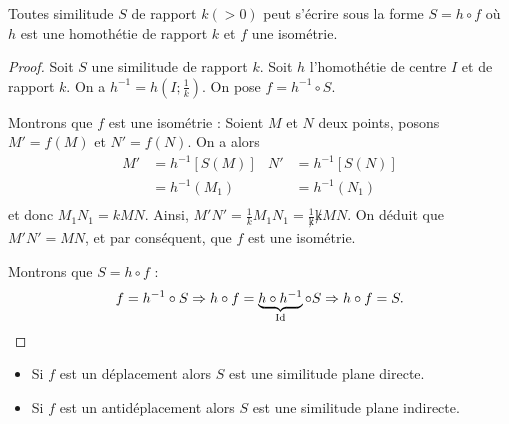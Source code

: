             \begin{thm}
                  Toutes similitude $S$ de rapport $k (>0)$ peut s'\'ecrire sous la forme $S = h \circ f$
                  o\`u $h$ est une homoth\'etie de rapport $k$ et $f$ une isom\'etrie.
                  \begin{proof}
                        Soit $S$ une similitude de rapport $k$.
                        Soit $h$ l'homoth\'etie de centre $I$ et de rapport $k$.
                        On a $h^{-1} = h\left(I ; \frac{1}{k}\right)$.
                        On pose $f = h^{-1} \circ S$.
                        
                        Montrons que $f$ est une isom\'etrie : \newline
                              Soient $M$ et $N$ deux points, posons $M' = f(M)$ et $N' = f(N)$.
                              On a alors 
                              \begin{align*}
                                    M' & = h^{-1} \left[ S(M) \right]       & N' & = h^{-1} \left[ S(N) \right]      \\
                                       & = h^{-1} (M_1)                     &    & = h^{-1} (N_1)                    \\
                              \end{align*}
                              et donc $M_1 N_1 = k MN$.
                              Ainsi, $M'N' = \frac{1}{k} M_1 N_1 = \frac{1}{\not k} \not k MN$.
                              On d\'eduit que $M'N' = MN$, et par cons\'equent, que $f$ est une isom\'etrie.
                              
                        Montrons que $S = h\circ f$ : \newline
                              \[
                                    f = h^{-1} \circ S 
                                          \Rightarrow 
                                                h \circ f = \underbrace{h \circ h^{-1}}_{\mathrm{Id}} \circ S
                                                      \Rightarrow
                                                            h \circ f = S.
                              \]
                  \end{proof}
                  \begin{itemize}
                        \item Si $f$ est un d\'eplacement alors $S$ est une similitude plane directe.
                        \item Si $f$ est un antid\'eplacement alors $S$ est une similitude plane indirecte.
                  \end{itemize}
            \end{thm}
